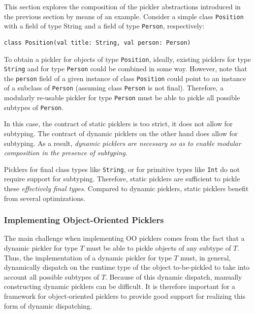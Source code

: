 \documentclass[preprint,10pt]{sigplanconf}
\theoremstyle{definition}
\theoremstyle{definition}
\newcommand{\term}[1]{\mbox{\texttt{#1}}}
\begin{document}


This section explores the composition of the pickler abstractions introduced
in the previous section by means of an example. Consider a simple class
\verb|Position| with a field of type String and a field of type \term{Person},
respectively:

\begin{lstlisting}
class Position(val title: String, val person: Person)
\end{lstlisting}

To obtain a pickler for objects of type \verb|Position|, ideally, existing
picklers for type \verb|String| and for type \verb|Person| could be combined
in some way. However, note that the \verb|person| field of a given instance of
class \verb|Position| could point to an instance of a subclass of
\verb|Person| (assuming class \verb|Person| is not final). Therefore, a
modularly re-usable pickler for type \verb|Person| must be able to pickle all
possible subtypes of \verb|Person|.

In this case, the contract of static picklers is too strict, it does not allow
for subtyping. The contract of dynamic picklers on the other hand does allow
for subtyping. As a result, {\em dynamic picklers are necessary so as to enable
modular composition in the presence of subtyping}.

Picklers for final class types like \term{String}, or for primitive types like
\term{Int} do not require support for subtyping. Therefore, static picklers
are sufficient to pickle these {\em effectively final types}. Compared to
dynamic picklers, static picklers benefit from several optimizations.


\subsubsection{Implementing Object-Oriented Picklers}

The main challenge when implementing OO picklers comes from the fact that a
dynamic pickler for type $T$ must be able to pickle objects of any subtype of
$T$. Thus, the implementation of a dynamic pickler for type $T$ must, in
general, dynamically dispatch on the runtime type of the object to-be-pickled
to take into account all possible subtypes of $T$. Because of this dynamic
dispatch, manually constructing dynamic picklers can be difficult. It is
therefore important for a framework for object-oriented picklers to provide
good support for realizing this form of dynamic dispatching.
\end{document}
